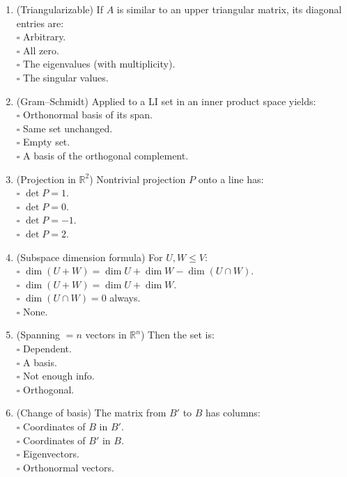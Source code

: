\documentclass[11pt]{article}
\theoremstyle{upright}
\begin{document}
\begin{enumerate}
\item (Triangularizable) If $A$ is similar to an upper triangular matrix, its diagonal entries are:\\
\(\square\) Arbitrary.\\
\(\square\) All zero.\\
\(\square\) The eigenvalues (with multiplicity).\\
\(\square\) The singular values.

\item (Gram–Schmidt) Applied to a LI set in an inner product space yields:\\
\(\square\) Orthonormal basis of its span.\\
\(\square\) Same set unchanged.\\
\(\square\) Empty set.\\
\(\square\) A basis of the orthogonal complement.

\item (Projection in $\mathbb{R}^2$) Nontrivial projection $P$ onto a line has:\\
\(\square\) $\det P=1$.\\
\(\square\) $\det P=0$.\\
\(\square\) $\det P=-1$.\\
\(\square\) $\det P=2$.

\item (Subspace dimension formula) For $U,W\le V$:\\
\(\square\) $\dim(U+W)=\dim U+\dim W-\dim(U\cap W)$.\\
\(\square\) $\dim(U+W)=\dim U+\dim W$.\\
\(\square\) $\dim(U\cap W)=0$ always.\\
\(\square\) None.

\item (Spanning $=n$ vectors in $\mathbb{R}^n$) Then the set is:\\
\(\square\) Dependent.\\
\(\square\) A basis.\\
\(\square\) Not enough info.\\
\(\square\) Orthogonal.

\item (Change of basis) The matrix from $B'$ to $B$ has columns:\\
\(\square\) Coordinates of $B$ in $B'$.\\
\(\square\) Coordinates of $B'$ in $B$.\\
\(\square\) Eigenvectors.\\
\(\square\) Orthonormal vectors.


\end{enumerate}
\end{document}
